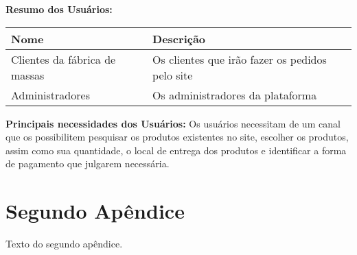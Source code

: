 \begin{apendicesenv}
\begin{tabular}{|p{2in}|p{2in}|p{2in}|}
\end{tabular}

\textbf{Resumo dos Usuários:}  \\

\begin{tabular}{|l|p{3in}|}
  \hline
  \textbf{Nome} & \textbf{Descrição} \\ \hline
  Clientes da fábrica de massas & Os clientes que irão fazer os pedidos pelo site \\ \hline
  Administradores & Os administradores da plataforma \\ \hline

\end{tabular}

\textbf{Principais necessidades dos Usuários:} Os usuários necessitam de um canal que os possibilitem pesquisar os produtos existentes no site, escolher os produtos, assim como sua quantidade, o local de entrega dos produtos e identificar a forma de pagamento que julgarem necessária.   \\

\chapter{Segundo Apêndice}

Texto do segundo apêndice.

\end{apendicesenv}
